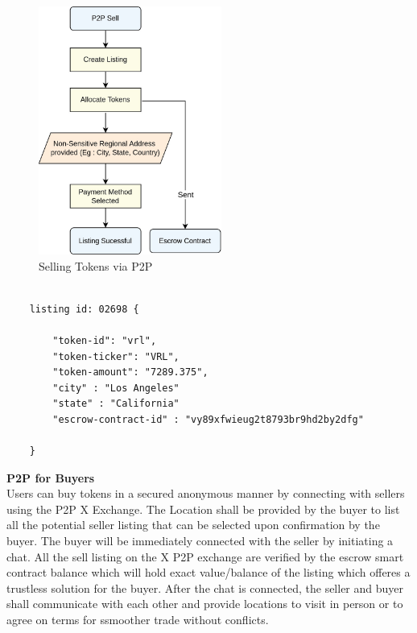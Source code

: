 \documentclass[letterpaper,11pt]{article}
\begin{document}
\begin{figure}[H]
\begin{center}
\includegraphics[width=6cm]{p2p-sell}
\caption{Selling Tokens via P2P}
\end{center}
\end{figure}

\begin{lstlisting}[caption={Token Sale Listing}, numbers=none]

	listing id: 02698 {
	
    	"token-id": "vrl",
   		"token-ticker": "VRL",
    	"token-amount": "7289.375",
    	"city" : "Los Angeles"
    	"state" : "California"
    	"escrow-contract-id" : "vy89xfwieug2t8793br9hd2by2dfg"
    	
	}
\end{lstlisting}

\textbf{P2P for Buyers}\\

Users can buy tokens in a secured anonymous manner by connecting with sellers using the P2P X Exchange. The Location shall be provided by the buyer to list all the potential seller listing that can be selected upon confirmation by the buyer. The buyer will be immediately connected with the seller by initiating a chat. All the sell listing on the X P2P exchange are verified by the escrow smart contract balance which will hold exact value/balance of the listing which offeres a trustless solution for the buyer. After the chat is connected, the seller and buyer shall communicate with each other and provide locations to visit in person or to agree on terms for ssmoother trade without conflicts.\\
\end{document}

